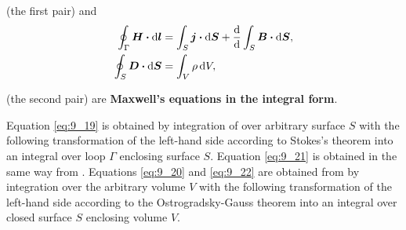 \noindent
(the first pair) and
\begin{align}
    \oint_{\Gamma} \boldsymbol{H} \boldsymbol{\cdot} \mathrm{d}\boldsymbol{l} &= \int_S \boldsymbol{j} \boldsymbol{\cdot} \mathrm{d}\boldsymbol{S} + \dfrac{\mathrm{d}}{\mathrm{d}} \int_S \boldsymbol{B} \boldsymbol{\cdot} \mathrm{d}\boldsymbol{S}, \label{eq:9_21}\\
    \oint_S \boldsymbol{D} \boldsymbol{\cdot} \mathrm{d}\boldsymbol{S} &= \int_V \rho\, \mathrm{d} V, \label{eq:9_22}
\end{align}

\noindent
(the second pair) are \textbf{Maxwell's equations in the integral form}.

Equation \eqref{eq:9_19} is obtained by integration of  over arbitrary surface $S$ with the following transformation of the left-hand side according to Stokes's theorem into an integral over loop $\Gamma$ enclosing surface $S$.
Equation \eqref{eq:9_21} is obtained in the same way from .
Equations \eqref{eq:9_20} and \eqref{eq:9_22} are obtained from  by integration over the arbitrary volume $V$ with the following transformation of the left-hand side according to the Ostrogradsky-Gauss theorem into an integral over closed surface $S$ enclosing volume $V$.
